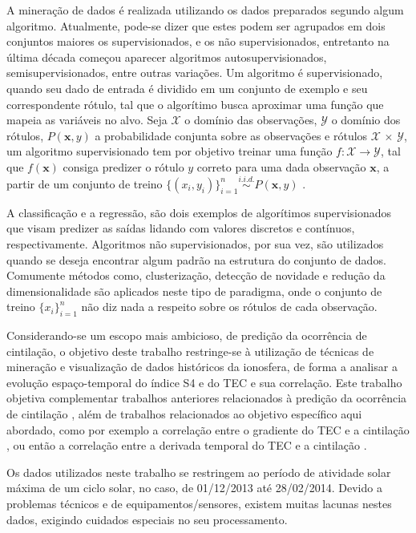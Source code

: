 A mineração de dados é realizada utilizando os dados preparados segundo algum algoritmo. Atualmente, pode-se dizer que estes podem ser agrupados em dois conjuntos maiores os supervisionados, e os não supervisionados, entretanto na última década começou aparecer algoritmos autosupervisionados, semisupervisionados, entre outras variações. Um algoritmo é supervisionado, quando seu dado de entrada é dividido em um conjunto de exemplo e seu correspondente rótulo, tal que o algorítimo busca aproximar uma função que mapeia as variáveis no alvo. Seja $\mathcal{X}$ o domínio das observações, $\mathcal{Y}$ o domínio dos rótulos, $P(\textbf{x}, y)$ a probabilidade conjunta sobre as observações e rótulos $\mathcal{X}$ $\times$ $\mathcal{Y}$, um algoritmo supervisionado tem por objetivo treinar uma função $f : \mathcal{X} \to \mathcal{Y}$, tal que $f(\textbf{x})$ consiga predizer o rótulo $y$ correto para uma dada observação $\textbf{x}$, a partir de um conjunto de treino $\{(x_i, y_i)\}_{i=1}^n \overset{i.i.d.}{\sim} P(\textbf{x}, y)$ \cite{ZHU:2009}.

A classificação e a regressão, são dois exemplos de algorítimos supervisionados que visam predizer as saídas lidando com valores discretos e contínuos, respectivamente. Algoritmos não supervisionados, por sua vez, são utilizados quando se deseja encontrar algum padrão na estrutura do conjunto de dados. Comumente métodos como, clusterização, detecção de novidade e redução da dimensionalidade são aplicados neste tipo de paradigma, onde o conjunto de treino $\{x_i\}_{i=1}^n$ não diz nada a respeito sobre os rótulos de cada observação.

Considerando-se um escopo mais ambicioso, de predição da ocorrência de cintilação, o objetivo deste trabalho restringe-se à utilização de técnicas de mineração e visualização de dados históricos da ionosfera, de forma a analisar a evolução espaço-temporal do índice S4 e do TEC e sua correlação. Este trabalho objetiva complementar trabalhos anteriores relacionados à predição da ocorrência de cintilação \cite{REZENDE:2009, GLAUSTON:2014, GLAUSTON:2015}, além de trabalhos relacionados ao objetivo específico aqui abordado, como por exemplo a correlação entre o gradiente do TEC e a cintilação \cite{RAGHAVARAO:1998, RAY:2006}, ou então a correlação entre a derivada temporal do TEC e a cintilação \cite{RAGHUNATH:2016}.

Os dados utilizados neste trabalho se restringem ao período de atividade solar máxima de um ciclo solar, no caso, de 01/12/2013 até 28/02/2014. Devido a problemas técnicos e de equipamentos/sensores, existem muitas lacunas nestes dados, exigindo cuidados especiais no seu processamento.
